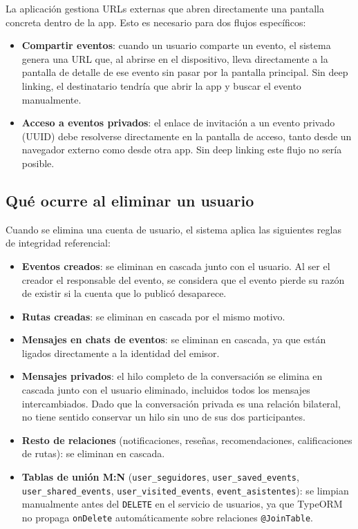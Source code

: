 La aplicación gestiona URLs externas que abren directamente una pantalla concreta dentro de la app. Esto es necesario para dos flujos específicos:

\begin{itemize}
    \item \textbf{Compartir eventos}: cuando un usuario comparte un evento, el sistema genera una URL que, al abrirse en el dispositivo, lleva directamente a la pantalla de detalle de ese evento sin pasar por la pantalla principal. Sin deep linking, el destinatario tendría que abrir la app y buscar el evento manualmente.
    \item \textbf{Acceso a eventos privados}: el enlace de invitación a un evento privado (UUID) debe resolverse directamente en la pantalla de acceso, tanto desde un navegador externo como desde otra app. Sin deep linking este flujo no sería posible.
\end{itemize}

\subsection{Qué ocurre al eliminar un usuario}

Cuando se elimina una cuenta de usuario, el sistema aplica las siguientes reglas de integridad referencial:

\begin{itemize}
    \item \textbf{Eventos creados}: se eliminan en cascada junto con el usuario. Al ser el creador el responsable del evento, se considera que el evento pierde su razón de existir si la cuenta que lo publicó desaparece.
    \item \textbf{Rutas creadas}: se eliminan en cascada por el mismo motivo.
    \item \textbf{Mensajes en chats de eventos}: se eliminan en cascada, ya que están ligados directamente a la identidad del emisor.
    \item \textbf{Mensajes privados}: el hilo completo de la conversación se elimina en cascada junto con el usuario eliminado, incluidos todos los mensajes intercambiados. Dado que la conversación privada es una relación bilateral, no tiene sentido conservar un hilo sin uno de sus dos participantes.
    \item \textbf{Resto de relaciones} (notificaciones, reseñas, recomendaciones, calificaciones de rutas): se eliminan en cascada.
    \item \textbf{Tablas de unión M:N} (\texttt{user\_seguidores}, \texttt{user\_saved\_events}, \texttt{user\_shared\_events}, \texttt{user\_visited\_events}, \texttt{event\_asistentes}): se limpian manualmente antes del \texttt{DELETE} en el servicio de usuarios, ya que TypeORM no propaga \texttt{onDelete} automáticamente sobre relaciones \texttt{@JoinTable}.
\end{itemize}


